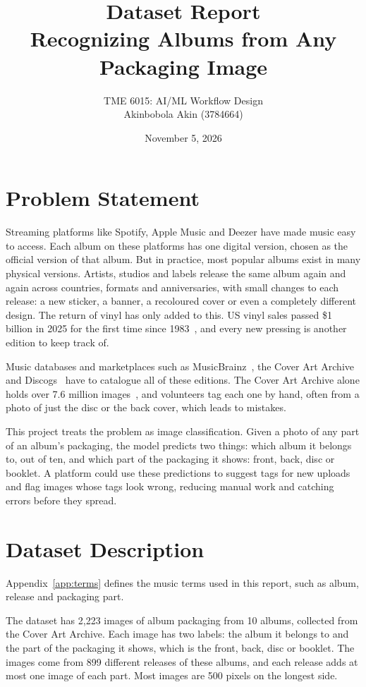 \documentclass[11pt,a4paper]{article}
\title{\textbf{Dataset Report}\\Recognizing Albums from Any Packaging Image}
\author{
    TME 6015: AI/ML Workflow Design\\[6pt]
    Akinbobola Akin (3784664)
}
\date{November 5, 2026}
\begin{document}
\maketitle

\section{Problem Statement}
Streaming platforms like Spotify, Apple Music and Deezer have made music easy to access. Each album on these platforms has one digital version, chosen as the official version of that album. But in practice, most popular albums exist in many physical versions. Artists, studios and labels release the same album again and again across countries, formats and anniversaries, with small changes to each release: a new sticker, a banner, a recoloured cover or even a completely different design. The return of vinyl has only added to this. US vinyl sales passed \$1 billion in 2025 for the first time since 1983~\cite{musicweek2026riaa}, and every new pressing is another edition to keep track of.

Music databases and marketplaces such as MusicBrainz~\cite{musicbrainz}, the Cover Art Archive~\cite{coverartarchive} and Discogs~\cite{discogs} have to catalogue all of these editions. The Cover Art Archive alone holds over 7.6 million images~\cite{caastats}, and volunteers tag each one by hand, often from a photo of just the disc or the back cover, which leads to mistakes.

This project treats the problem as image classification. Given a photo of any part of an album's packaging, the model predicts two things: which album it belongs to, out of ten, and which part of the packaging it shows: front, back, disc or booklet. A platform could use these predictions to suggest tags for new uploads and flag images whose tags look wrong, reducing manual work and catching errors before they spread.

\section{Dataset Description}
Appendix~\ref{app:terms} defines the music terms used in this report, such as album, release and packaging part.

The dataset has 2,223 images of album packaging from 10 albums, collected from the Cover Art Archive. Each image has two labels: the album it belongs to and the part of the packaging it shows, which is the front, back, disc or booklet. The images come from 899 different releases of these albums, and each release adds at most one image of each part. Most images are 500 pixels on the longest side.
\end{document}
